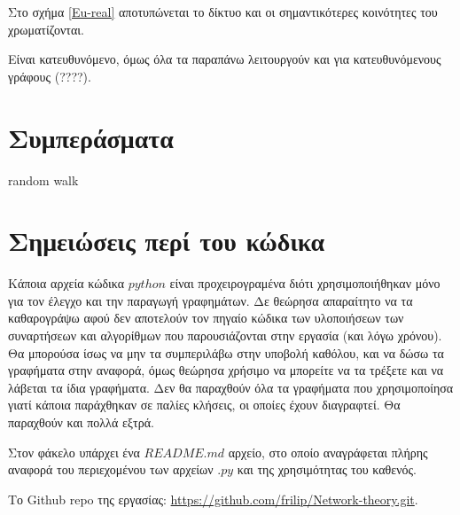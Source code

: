 \documentclass[12pt, letterpaper]{article}
\newcommand{\en}{\selectlanguage{english}}
\newcommand{\gr}{\selectlanguage{greek}}
\begin{document}
Στο σχήμα \ref{Eu-real} αποτυπώνεται το δίκτυο και οι σημαντικότερες κοινότητες του 
χρωματίζονται.


Είναι κατευθυνόμενο, όμως όλα τα παραπάνω λειτουργούν 
και για κατευθυνόμενους γράφους (????). 

\section{Συμπεράσματα}




random walk





\section{Σημειώσεις περί του κώδικα}

Κάποια αρχεία κώδικα $python$ είναι προχειρογραμένα διότι χρησιμοποιήθηκαν μόνο για τον έλεγχο και την παραγωγή γραφημάτων.
Δε θεώρησα απαραίτητο να τα καθαρογράψω αφού δεν αποτελούν τον πηγαίο κώδικα των υλοποιήσεων των συναρτήσεων και αλγορίθμων 
που παρουσιάζονται στην εργασία (και λόγω χρόνου). Θα μπορούσα ίσως να μην τα συμπεριλάβω στην υποβολή καθόλου, και να δώσω τα γραφήματα 
στην αναφορά, όμως θεώρησα χρήσιμο να μπορείτε να τα τρέξετε και να λάβεται τα ίδια γραφήματα. Δεν θα παραχθούν όλα 
τα γραφήματα που χρησιμοποίησα γιατί κάποια παράχθηκαν σε παλίες κλήσεις, οι οποίες έχουν διαγραφτεί. Θα παραχθούν και πολλά εξτρά.

Στον φάκελο υπάρχει ένα $README.md$ αρχείο, στο οποίο αναγράφεται πλήρης αναφορά του περιεχομένου των αρχείων $.py$ 
και της χρησιμότητας του καθενός. 

Το \textlatin{Github repo} της εργασίας: \en \href{https://github.com/frilip/Network-theory.git}{https://github.com/frilip/Network-theory.git}.

\gr

\renewcommand{\refname}{\selectlanguage{greek} Αναφορές}  


\end{document}

